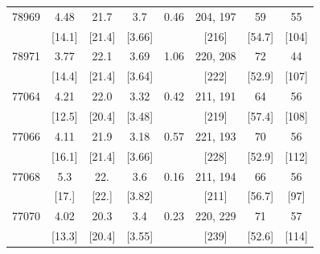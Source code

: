 \documentclass[aip,reprint]{revtex4-1}
\begin{document}
\begin{table}
\begin{ruledtabular}
\begin{tabular}{c c c c c c c c}
78969 & 4.48  & 21.7   & 3.7   & 0.46 & 204, 197 & 59      & 55  \\
\vspace{2mm}
         &[14.1] & [21.4] &[3.66]&        &[216]       & [54.7]&[104] \\ 

78971 & 3.77 &	22.1 & 3.69& 1.06 & 220, 208& 72    &	44 \\
\vspace{2mm}
         &[14.4] &[21.4]  &[3.64]&        & [222]     &[52.9]&[107]  \\ 

77064  & 4.21  & 22.0   & 3.32&  0.42& 211, 191& 64     & 56  \\
\vspace{2mm}
          & [12.5]& [20.4] &[3.48]&      & [219]      & [57.4]&  [108] \\ 

77066  & 4.11  & 21.9  & 3.18& 0.57& 221, 193& 70     & 56 \\
\vspace{2mm}
          & [16.1]&[21.4]&[3.66]&      &  [228]    &[52.9]&[112]  \\ 

77068  & 5.3  & 22.  & 3.6  &  0.16& 211, 194  & 66   & 56 \\
\vspace{2mm}
          & [17.]&[22.]&[3.82]&        &[211]       &[56.7]& [97]  \\ 

77070  & 4.02  & 20.3  &	3.4   & 0.23 & 220, 229  & 71     & 57  \\
           &[13.3]&[20.4] & [3.55]&        &[239]        &[52.6] &[114]\\
\end{tabular}
\end{ruledtabular}
\end{table}
\end{document}
